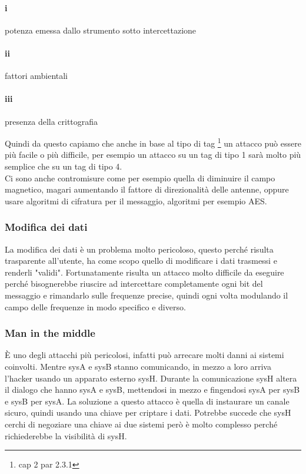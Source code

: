 \paragraph{i} potenza emessa dallo strumento sotto intercettazione
\paragraph{ii} fattori ambientali
\paragraph{iii} presenza della crittografia

Quindi da questo capiamo che anche in base al tipo di tag \footnote{cap 2 par 2.3.1} un attacco può essere più facile o più difficile, per esempio un attacco su un tag di tipo 1 sarà molto più semplice che su un tag di tipo 4.
\\Ci sono anche contromisure come per esempio quella di diminuire il campo magnetico, magari aumentando il fattore di direzionalità delle antenne, oppure usare algoritmi di cifratura per il messaggio, algoritmi per esempio AES.
\subsubsection{Modifica dei dati}
La modifica dei dati è un problema molto pericoloso, questo perché risulta trasparente all'utente, ha come scopo quello di modificare i dati trasmessi e renderli "validi". Fortunatamente risulta un attacco molto difficile da eseguire perché bisognerebbe riuscire ad intercettare completamente ogni bit del messaggio e rimandarlo sulle frequenze precise, quindi ogni volta modulando il campo delle frequenze in modo specifico e diverso.
\subsubsection{Man in the middle}
È uno degli attacchi più pericolosi, infatti può arrecare molti danni ai sistemi coinvolti. Mentre sysA e sysB stanno comunicando, in mezzo a loro arriva l'hacker usando un apparato esterno sysH. Durante la comunicazione sysH altera il dialogo che hanno sysA e sysB, mettendosi in mezzo e fingendosi sysA per sysB e sysB per sysA. La soluzione a questo attacco è quella di instaurare un canale sicuro, quindi usando una chiave per criptare i dati. 
Potrebbe succede che sysH cerchi di negoziare una chiave ai due sistemi però è molto complesso perché richiederebbe la visibilità di sysH.

